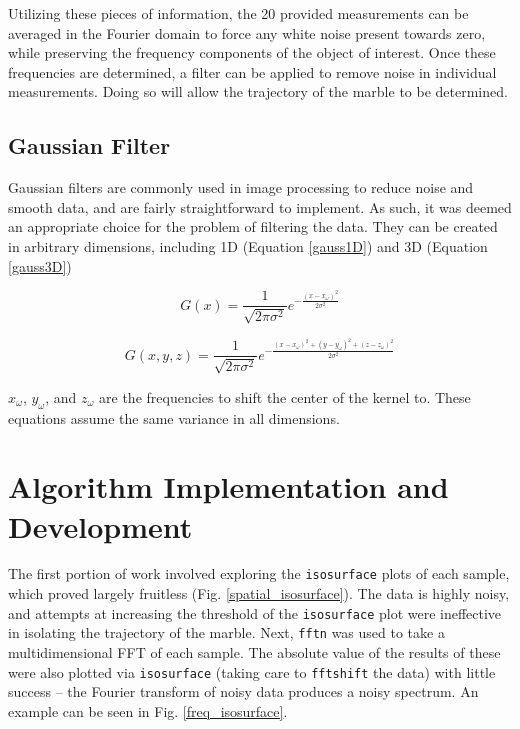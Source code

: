 \documentclass[journal]{IEEEtran}
\def\code#1{\texttt{#1}}
\begin{document}
Utilizing these pieces of information, the 20 provided measurements can be averaged in the Fourier domain to force any white noise present towards zero, while preserving the frequency components of the object of interest. Once these frequencies are determined, a filter can be applied to remove noise in individual measurements. Doing so will allow the trajectory of the marble to be determined.

\subsection{Gaussian Filter}
Gaussian filters are commonly used in image processing to reduce noise and smooth data, and are fairly straightforward to implement. As such, it was deemed an appropriate choice for the problem of filtering the data. They can be created in arbitrary dimensions, including 1D (Equation \ref{gauss1D}) and 3D (Equation \ref{gauss3D})

\begin{equation}
\label{gauss1D}
G(x)=\frac{1}{\sqrt{2\pi\sigma^2}}e^{-\frac{(x-x_{\omega})^2}{2\sigma^2}}
\end{equation}

\begin{equation}
\label{gauss3D}
G(x,y,z)=\frac{1}{\sqrt{2\pi\sigma^2}}e^{-\frac{(x-x_{\omega})^2+(y-y_{\omega})^2+(z-z_{\omega})^2}{2\sigma^2}}
\end{equation}

$x_{\omega}$, $y_{\omega}$, and $z_{\omega}$ are the frequencies to shift the center of the kernel to. These equations assume the same variance in all dimensions.

\section{Algorithm Implementation and Development}
The first portion of work involved exploring the \code{isosurface} plots of each sample, which proved largely fruitless (Fig. \ref{spatial_isosurface}). The data is highly noisy, and attempts at increasing the threshold of the \code{isosurface} plot were ineffective in isolating the trajectory of the marble. Next, \code{fftn} was used to take a multidimensional FFT of each sample. The absolute value of the results of these were also plotted via \code{isosurface} (taking care to \code{fftshift} the data) with little success -- the Fourier transform of noisy data produces a noisy spectrum. An example can be seen in Fig. \ref{freq_isosurface}. 
\end{document}

